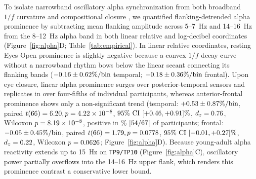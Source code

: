 \documentclass[11pt,letterpaper]{article}
\begin{document}
To isolate narrowband oscillatory alpha synchronization from both broadband $1/f$ curvature and compositional closure \citep{donoghue2020parameterizing,keil2022recommendations}, we quantified flanking-detrended alpha prominence by subtracting mean flanking amplitude across 5--7~Hz and 14--16~Hz from the 8--12~Hz alpha band in both linear relative and log-decibel coordinates (Figure~\ref{fig:alpha}D; Table~\ref{tab:empirical}). In linear relative coordinates, resting Eyes Open prominence is slightly negative because a convex $1/f$ decay curve without a narrowband rhythm bows below the linear secant connecting its flanking bands ($-0.16 \pm 0.62\%/\text{bin}$ temporal; $-0.18 \pm 0.36\%/\text{bin}$ frontal). Upon eye closure, linear alpha prominence surges over posterior-temporal sensors and replicates in over four-fifths of individual participants, whereas anterior-frontal prominence shows only a non-significant trend (temporal: $+0.53 \pm 0.87\%/\text{bin}$, paired $t(66) = 6.20, p = 4.22\times 10^{-8}$, $95\%\text{ CI } [+0.46, +0.91]\%$, $d_z = 0.76$, Wilcoxon $p = 8.19\times 10^{-8}$, positive in \PctRepTemp\% [$54/67$] of participants; frontal: $-0.05 \pm 0.45\%/\text{bin}$, paired $t(66) = 1.79, p = 0.0778$, $95\%\text{ CI } [-0.01, +0.27]\%$, $d_z = 0.22$, Wilcoxon $p = 0.0626$; Figure~\ref{fig:alpha}D). Because young-adult alpha reactivity extends up to 15~Hz on \texttt{TP9/TP10} (Figure~\ref{fig:alpha}C), oscillatory power partially overflows into the 14--16~Hz upper flank, which renders this prominence contrast a conservative lower bound.
\end{document}

